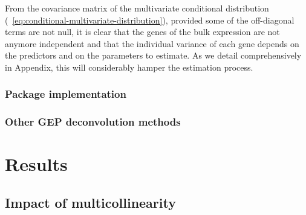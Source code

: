 \documentclass[long, final]{jobim}
\DeclareMathOperator*{\DET}{Det}
\begin{document}
From the covariance matrix of the multivariate conditional distribution (\equationname~\ref{eq:conditional-multivariate-distribution}), provided some of the off-diagonal terms are not null, it is clear that the genes of the bulk expression are not anymore independent and that the individual variance of each gene depends on the predictors and on the parameters to estimate. As we detail comprehensively in Appendix, this will considerably hamper the estimation process.




\subsubsection{Package implementation}
\label{subsubsec:implementation}

\subsubsection{Other GEP deconvolution methods}
\label{subsubsec:other-deconv-methods}

\section{Results}
\label{sec:results}

\subsection{Impact of multicollinearity}
\label{subsec:multicollinearity}
\end{document}
